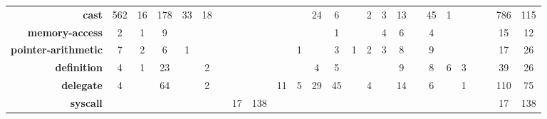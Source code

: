 \begin{table*}[!t]
\begin{adjustbox}{max width=\textwidth}
\begin{tabular}{r|cc|cc|cc|cc|cc|cc|cc|cc|cc|cc|cc|cc}
                    \textbf{cast} & 562 & 16 & 178 & 33 & 18 & & & & & & 24 & 6 && 2 & 3 & 13 & & 45 & 1 & & & & 786 & 115 \\ 
\rowcolor{verylightgray}
      \textbf{memory-access} &    2 &    1 &    9 &      &      &      &       &      &        &      &      &    1 &      &      &      4 &    6 &       &    4 &         &      &        &      &    15 &   12 \\
 \textbf{pointer-arithmetic} &    7 &    2 &    6 &    1 &      &      &       &      &        &    1 &      &    3 &    1 &    2 &      3 &    8 &       &    9 &         &      &        &      &    17 &   26 \\
\rowcolor{verylightgray}
         \textbf{definition} &    4 &    1 &   23 &      &    2 &      &       &      &        &      &    4 &    5 &      &      &        &    9 &       &    8 &       6 &    3 &        &      &    39 &   26 \\
           \textbf{delegate} &    4 &      &   64 &      &    2 &      &       &      &     11 &    5 &   29 &   45 &      &    4 &        &   14 &       &    6 &         &    1 &        &      &   110 &   75 \\
\rowcolor{verylightgray}
            \textbf{syscall} &      &      &      &      &      &      &    17 &  138 &        &      &      &      &      &      &        &      &       &      &         &      &        &      &    17 &  138 \\

\end{tabular}
\end{adjustbox}
\end{table*}
